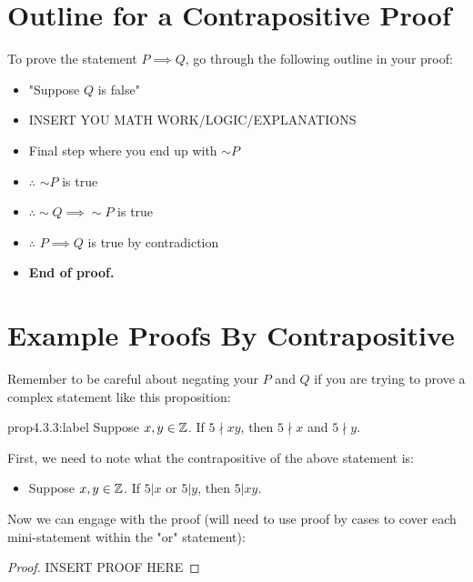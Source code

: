 \newpage
\section{Outline for a Contrapositive Proof}

To prove the statement $P\implies Q$, go through the following outline in your proof:

\begin{itemize}
    \item "Suppose $Q$ is false"
    \item INSERT YOU MATH WORK/LOGIC/EXPLANATIONS
    \item Final step where you end up with $\sim P$
    \item $\therefore$ $\sim P$ is true
    \item $\therefore \sim Q \implies \sim P$ is true
    \item $\therefore$ $P \implies Q$ is true by contradiction
    \item \textbf{End of proof.} 
\end{itemize}


\section{Example Proofs By Contrapositive}

Remember to be careful about negating your $P$ and $Q$ if you are trying to prove a complex statement like this proposition:

\begin{proposition}{prop4.3.3:label}
    Suppose $x,y \in \mathbb{Z}$. If $5 \nmid xy$, then $5 \nmid x$ and $5 \nmid y$.
\end{proposition}

First, we need to note what the contrapositive of the above statement is:

\begin{itemize}
    \item Suppose $x,y \in \mathbb{Z}$. If $5|x$ or $5|y$, then $5|xy$.
\end{itemize}

Now we can engage with the proof (will need to use proof by cases to cover each mini-statement within the "or" statement):

\begin{proof}
    INSERT PROOF HERE
\end{proof}